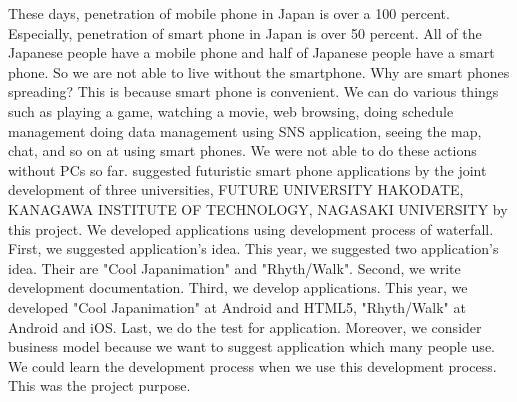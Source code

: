 \begin{eabstract}
These days, penetration of mobile phone in Japan is over a 100 percent. Especially, penetration of smart phone in Japan is over 50 percent. All of the Japanese people have a mobile phone and half of Japanese people have a smart phone. So we are not able to live without the smartphone.
Why are smart phones spreading? This is because smart phone is convenient. We can do various things such as playing a game, watching a movie, web browsing, doing schedule management doing data management using SNS application, seeing the map, chat, and so on at using smart phones. We were not able to do these actions without PCs so far. 
suggested futuristic smart phone applications by the joint development of three universities, FUTURE UNIVERSITY HAKODATE, KANAGAWA INSTITUTE OF TECHNOLOGY, NAGASAKI UNIVERSITY by this project.
We developed applications using development process of waterfall. First, we suggested application's idea. This year, we suggested two application's idea. Their are "Cool Japanimation" and "Rhyth/Walk". Second, we write development documentation. Third, we develop applications. This year, we developed "Cool Japanimation" at Android and HTML5, "Rhyth/Walk" at Android and iOS. Last, we do the test for application. Moreover, we consider business model because we want to suggest application which many people use. 
We could learn the development process when we use this development process. This was the project purpose. 
\\[5mm]
\end{eabstract}
